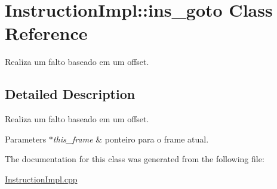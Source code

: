 \hypertarget{class_instruction_impl_1_1ins__goto}{}\section{Instruction\+Impl\+:\+:ins\+\_\+goto Class Reference}
\label{class_instruction_impl_1_1ins__goto}


Realiza um falto baseado em um offset.  




\subsection{Detailed Description}
Realiza um falto baseado em um offset. 


\begin{DoxyParams}{Parameters}
{\em $\ast$this\+\_\+frame} & ponteiro para o frame atual.  \\
\hline
\end{DoxyParams}


The documentation for this class was generated from the following file\+:\begin{DoxyCompactItemize}
\item 
\hyperlink{_instruction_impl_8cpp}{Instruction\+Impl.\+cpp}\end{DoxyCompactItemize}
